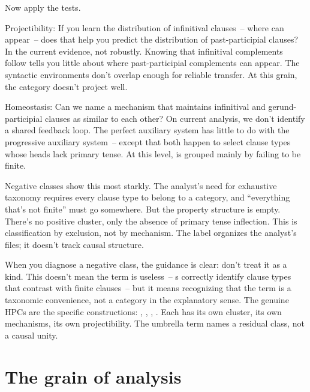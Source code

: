 Now apply the tests.

Projectibility: If you learn the distribution of infinitival clauses~-- where  can appear~-- does that help you predict the distribution of past-participial clauses? In the current evidence, not robustly. Knowing that infinitival complements follow  tells you little about where past-participial complements can appear. The syntactic environments don't overlap enough for reliable transfer. At this grain, the category doesn't project well.

Homeostasis: Can we name a mechanism that maintains infinitival and gerund-participial clauses as similar to each other? On current analysis, we don't identify a shared feedback loop. The perfect auxiliary system has little to do with the progressive auxiliary system~-- except that both happen to select clause types whose heads lack primary tense. At this level,  is grouped mainly by failing to be finite.

Negative classes show this most starkly. The analyst's need for exhaustive taxonomy requires every clause type to belong to a category, and \enquote{everything that's not finite} must go somewhere. But the property structure is empty. There's no positive cluster, only the absence of primary tense inflection. This is classification by exclusion, not by mechanism. The label  organizes the analyst's files; it doesn't track causal structure.

When you diagnose a negative class, the guidance is clear: don't treat it as a kind. This doesn't mean the term is useless~-- s correctly identify clause types that contrast with finite clauses~-- but it means recognizing that the term is a taxonomic convenience, not a category in the explanatory sense. The genuine HPCs are the specific constructions: , , , . Each has its own cluster, its own mechanisms, its own projectibility. The umbrella term names a residual class, not a causal unity.

\section{The grain of analysis}
\label{sec:8:grain}

